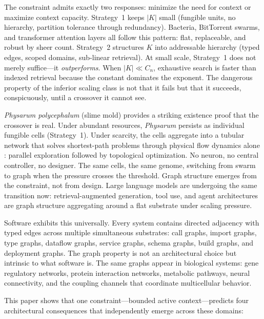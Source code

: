 \documentclass[11pt]{article}
\theoremstyle{definition}
\theoremstyle{remark}
\begin{document}
The constraint admits exactly two responses: minimize the need for
context or maximize context capacity. Strategy~1 keeps $|K|$ small
(fungible units, no hierarchy, partition tolerance through
redundancy). Bacteria, BitTorrent swarms, and transformer attention
layers all follow this pattern: flat, replaceable, and robust by sheer
count. Strategy~2 structures $K$ into addressable hierarchy (typed
edges, scoped domains, sub-linear retrieval). At small scale,
Strategy~1 does not merely suffice---it \emph{outperforms}. When
$|K| \ll C_n$, exhaustive search is faster than indexed retrieval
because the constant dominates the exponent. The dangerous property of
the inferior scaling class is not that it fails but that it succeeds,
conspicuously, until a crossover it cannot see.

\emph{Physarum polycephalum} (slime mold) provides a striking
existence proof that the crossover is real. Under abundant resources,
\emph{Physarum} persists as individual fungible cells (Strategy~1).
Under scarcity, the cells aggregate into a tubular network that solves
shortest-path problems through physical flow dynamics alone
\cite{Nakagaki2000}: parallel exploration followed by topological
optimization. No neuron, no central controller, no designer. The same
cells, the same genome, switching from swarm to graph when the
pressure crosses the threshold. Graph structure emerges from the
constraint, not from design. Large language models are undergoing the
same transition now: retrieval-augmented generation, tool use, and
agent architectures are graph structure aggregating around a flat
substrate under scaling pressure.

Software exhibits this universally. Every system contains directed
adjacency with typed edges across multiple simultaneous substrates:
call graphs, import graphs, type graphs, dataflow graphs, service
graphs, schema graphs, build graphs, and deployment graphs. The graph
property is not an architectural choice but intrinsic to what software
is. The same graphs appear in biological systems: gene regulatory
networks, protein interaction networks, metabolic pathways, neural
connectivity, and the coupling channels that coordinate multicellular
behavior.

This paper shows that one constraint---bounded active context---predicts
four architectural consequences that independently emerge across these
domains:
\end{document}
